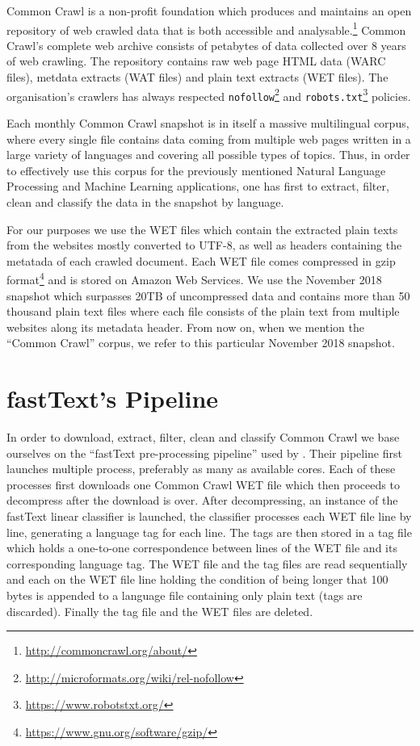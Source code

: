 Common Crawl is a non-profit foundation which produces and maintains an open repository of web crawled data that is both accessible and analysable.\footnote{\url{http://commoncrawl.org/about/}} Common Crawl's complete web archive consists of petabytes of data collected over 8 years of web crawling. The repository contains raw web page HTML data (WARC files), metdata extracts (WAT files) and plain text extracts (WET files). The organisation's crawlers has always respected \texttt{nofollow}\footnote{\url{http://microformats.org/wiki/rel-nofollow}} and \texttt{robots.txt}\footnote{\url{https://www.robotstxt.org/}} policies.

Each monthly Common Crawl snapshot is in itself a massive multilingual corpus, where every single file contains data coming from multiple web pages written in a large variety of languages and covering all possible types of topics. Thus, in order to effectively use this corpus for the previously mentioned Natural Language Processing and Machine Learning applications, one has first to extract, filter, clean and classify the data in the snapshot by language.

For our purposes we use the WET files which contain the extracted plain texts from the websites mostly converted to UTF-8, as well as headers containing the metatada of each crawled document. Each WET file comes compressed in gzip format\footnote{\url{https://www.gnu.org/software/gzip/}} and is stored on Amazon Web Services. We use the November 2018 snapshot which surpasses 20TB of uncompressed data and contains more than 50 thousand plain text files where each file consists of the plain text from multiple websites along its metadata header. From now on, when we mention the ``Common Crawl'' corpus, we refer to this particular November 2018 snapshot.

\section{fastText's Pipeline}

In order to download, extract, filter, clean and classify Common Crawl we base ourselves on the ``fastText pre-processing pipeline'' used by \citet{grave-etal-2018-learning}. Their pipeline first launches multiple process, preferably as many as available cores. Each of these processes first downloads one Common Crawl WET file which then proceeds to decompress after the download is over. After decompressing, an instance of the fastText linear classifier \citep{joulin-etal-2016-fasttext, joulin-etal-2017-bag} is launched, the classifier processes each WET file line by line, generating a language tag for each line. The tags are then stored in a tag file which holds a one-to-one correspondence between lines of the WET file and its corresponding language tag. The WET file and the tag files are read sequentially and each on the WET file line holding the condition of being longer that 100 bytes is appended to a language file containing only plain text (tags are discarded). Finally the tag file and the WET files are deleted.

